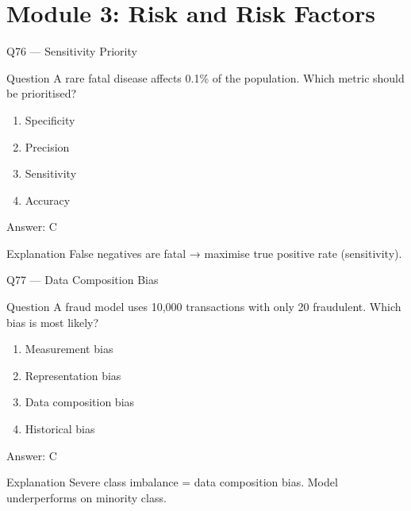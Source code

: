 \documentclass[aspectratio=169,8pt]{beamer}
\begin{document}
	\section{Module 3: Risk and Risk Factors}
	
	\begin{frame}{Q76 --- Sensitivity Priority}
		\begin{block}{Question}
			A rare fatal disease affects 0.1\% of the population. Which metric should be prioritised?
		\end{block}
		\begin{enumerate}
			\item Specificity
			\item Precision
			\item Sensitivity
			\item Accuracy
		\end{enumerate}
		\begin{exampleblock}{Answer: C}\end{exampleblock}
		\begin{block}{Explanation}
			False negatives are fatal → maximise true positive rate (sensitivity).
		\end{block}
	\end{frame}
	
	\begin{frame}{Q77 --- Data Composition Bias}
		\begin{block}{Question}
			A fraud model uses 10,000 transactions with only 20 fraudulent. Which bias is most likely?
		\end{block}
		\begin{enumerate}
			\item Measurement bias
			\item Representation bias
			\item Data composition bias
			\item Historical bias
		\end{enumerate}
		\begin{exampleblock}{Answer: C}\end{exampleblock}
		\begin{block}{Explanation}
			Severe class imbalance = data composition bias. Model underperforms on minority class.
		\end{block}
	\end{frame}
	
\end{document}
